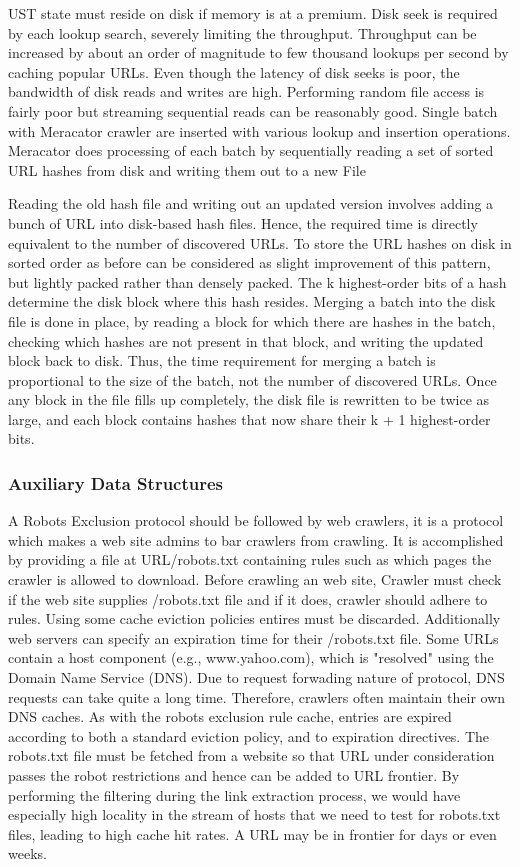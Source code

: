 \documentclass[article,type=msc,colorback,accentcolor=tud9c,twoside,11pt]{tudthesis}
\begin{document}
UST state must reside on disk if memory is at a premium. Disk seek is required by each lookup search, severely limiting the throughput. Throughput can be increased by about an order of magnitude\cite{Graphstructure} to few thousand lookups per second by caching popular URLs. Even though the latency of disk seeks is poor, the bandwidth of disk reads and writes are high. Performing random file access is fairly poor but streaming sequential reads can be reasonably good. Single batch with Meracator crawler are inserted with various lookup and insertion operations. Meracator does processing of each batch by sequentially reading a set of sorted URL hashes from disk and writing them out to a new File\cite{Highperformancewebcrawling}

Reading the old hash file and writing out an updated version involves adding a bunch of URL into disk-based hash files. Hence, the required time is directly equivalent to the number of discovered URLs. To store the URL hashes on disk in sorted order as before can be considered as slight improvement of this pattern, but lightly packed rather than densely packed. The k highest-order bits of a hash determine the disk block where this hash resides. Merging a batch into the disk file is done in place, by reading a block for which there are hashes in the batch, checking which hashes are not present in that block, and writing the updated block back to disk. Thus, the time requirement for merging a batch is proportional to the size of the batch, not the number of discovered URLs. Once any block in the file fills up completely, the disk file is rewritten to be twice as large, and each block contains hashes that now share their k + 1 highest-order bits.

\subsubsection{Auxiliary Data Structures}
A Robots Exclusion protocol should be followed by web crawlers, it is a protocol which makes a web site admins to bar crawlers from crawling. It is accomplished by providing a file at URL/robots.txt containing rules such as which pages the crawler is allowed to download. Before crawling an web site, Crawler must check if the web site supplies /robots.txt file and if it does, crawler should adhere to rules. Using some cache eviction policies entires must be discarded. Additionally web servers can specify an expiration time for their /robots.txt file. Some URLs contain a host component (e.g., www.yahoo.com), which is "resolved" using the Domain Name Service (DNS). Due to request forwading nature of protocol, DNS requests can take quite a long time. Therefore, crawlers often maintain their own DNS caches. As with the robots exclusion rule cache, entries are expired according to both a standard eviction policy, and to expiration directives. The robots.txt file must be fetched from a website so that URL under consideration passes the robot restrictions and hence can be added to URL frontier. By performing the filtering during the link extraction process, we would have especially high locality in the stream of hosts that we need to test for robots.txt files, leading to high cache hit rates. A URL may be in frontier for days or even weeks.
 
\end{document}
